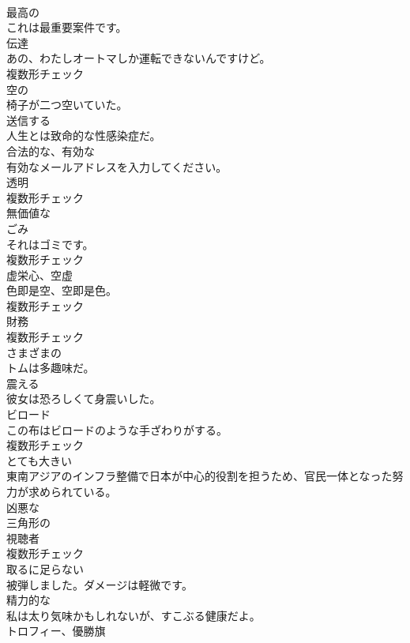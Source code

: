 \documentclass[8pt]{extreport}
\begin{document}
\begin{CJK}{UTF8}{min}
\\	[形容詞]	最高の	
\\	これは最重要案件です。	
\\	[名詞]	伝達	
\\	あの、わたしオートマしか運転できないんですけど。	
\\	複数形チェック
\\	[形容詞]	空の	
\\	椅子が二つ空いていた。	
\\	[動詞]	送信する	
\\	人生とは致命的な性感染症だ。	
\\	[形容詞]	合法的な、有効な	
\\	有効なメールアドレスを入力してください。	
\\	[名詞]	透明	
\\	複数形チェック
\\	[形容詞]	無価値な	
\\	[名詞]	ごみ	
\\	それはゴミです。	
\\	複数形チェック
\\	[名詞]	虚栄心、空虚	
\\	色即是空、空即是色。	
\\	複数形チェック
\\	[名詞]	財務	
\\	複数形チェック
\\	[形容詞]	さまざまの	
\\	トムは多趣味だ。	
\\	[動詞]	震える	
\\	彼女は恐ろしくて身震いした。	
\\	[名詞]	ビロード	
\\	この布はビロードのような手ざわりがする。	
\\	複数形チェック
\\	[形容詞]	とても大きい	
\\	東南アジアのインフラ整備で日本が中心的役割を担うため、官民一体となった努力が求められている。	
\\	[形容詞]	凶悪な	
\\	[形容詞]	三角形の	
\\	[名詞]	視聴者	
\\	複数形チェック
\\	[形容詞]	取るに足らない	
\\	被弾しました。ダメージは軽微です。	
\\	[形容詞]	精力的な	
\\	私は太り気味かもしれないが、すこぶる健康だよ。	
\\	[名詞]	トロフィー、優勝旗	

\end{CJK}
\end{document}
